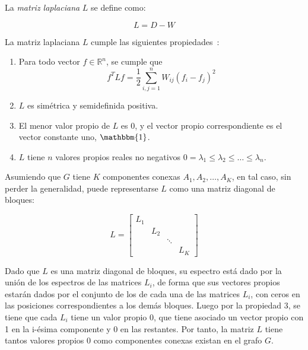 La \textit{matriz laplaciana} $L$ se define como:

\begin{equation*}
    L = D - W
\end{equation*}

La matriz laplaciana $L$ cumple las siguientes propiedades~\cite{Luxburg07}:

\begin{enumerate}
    \item Para todo vector $f\in \mathbb{R}^n$, se cumple que
    \[
        f^T Lf = \frac{1}{2}\sum_{i,j=1}^{n}{W_{ij}(f_i - f_j)^2}
    \]
    \item $L$ es simétrica y semidefinida positiva.
    \item El menor valor propio de $L$ es 0, y el vector propio correspondiente es el vector constante uno, $\mathbbm{1}$.
    \item $L$ tiene $n$ valores propios reales no negativos $0=\lambda_1 \leq \lambda_2 \leq \dots \leq \lambda_n$.
\end{enumerate}

Asumiendo que $G$ tiene $K$ componentes conexas $A_1,A_2,\dots,A_K$, en tal caso, sin perder la generalidad, puede representarse $L$ como una matriz diagonal de bloques:

\begin{equation*}
    L =
    \begin{bmatrix}
        L_1 & & &     \\
        & L_2 & &     \\
        & & \ddots &     \\
        & & & L_K
    \end{bmatrix}
\end{equation*}

Dado que $L$ es una matriz diagonal de bloques, su espectro está dado por la unión de los espectros de las matrices $L_i$, de forma que sus vectores propios estarán dados por el conjunto de los de cada una de las matrices $L_i$, con ceros en las posiciones correspondientes a los demás bloques.
Luego por la propiedad 3, se tiene que cada $L_i$ tiene un valor propio 0, que tiene asociado un vector propio con 1 en la i-ésima componente y 0 en las restantes.
Por tanto, la matriz $L$ tiene tantos valores propios 0 como componentes conexas existan en el grafo $G$.

